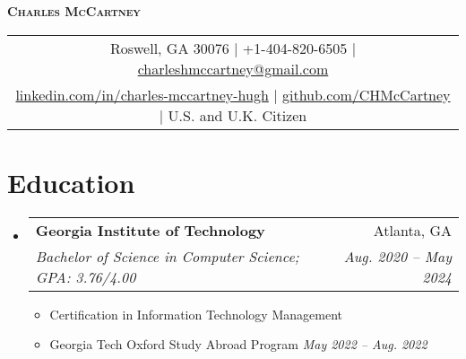\documentclass[letterpaper,11pt]{article}
\makeatletter
\newcommand{\resumeItem}[1]{
  \item\small{
    {#1 \vspace{-2pt}}
  }
}
\newcommand{\resumeSubheading}[4]{
  \vspace{-2pt}\item
    \begin{tabular*}{0.97\textwidth}[t]{l@{\extracolsep{\fill}}r}
      \textbf{#1} & #2 \\
      \textit{\small#3} & \textit{\small #4} \\
    \end{tabular*}\vspace{-7pt}
}
\newcommand{\resumeSubHeadingListStart}{\begin{itemize}[leftmargin=0.15in, label={}]}
\newcommand{\resumeSubHeadingListEnd}{\end{itemize}}
\newcommand{\resumeItemListStart}{\begin{itemize}}
\newcommand{\resumeItemListEnd}{\end{itemize}\vspace{-3pt}}
\makeatother
\begin{document}


\begin{center}
    \textbf{\Large \scshape Charles McCartney} \\ \vspace{1pt}
    \begin{tabular}{c}
    Roswell, GA 30076 $|$ +1-404-820-6505 $|$ \href{mailto:charleshmccartney@gmail.com}{charleshmccartney@gmail.com} \\ 
    \href{https://linkedin.com/in/charles-mccartney-hugh}{linkedin.com/in/charles-mccartney-hugh} 
    $|$
    \href{https://github.com/CHMcCartney}{github.com/CHMcCartney} $|$ U.S. and U.K. Citizen
    \end{tabular}
\end{center}


\section{Education}
  \resumeSubHeadingListStart
    \resumeSubheading
      {Georgia Institute of Technology}{Atlanta, GA}
      {Bachelor of Science in Computer Science; GPA: 3.76/4.00}{Aug. 2020 -- May 2024}
    \resumeItemListStart
        \resumeItem{Certification in Information Technology Management} 
        \resumeItem{Georgia Tech Oxford Study Abroad Program \hfill \emph{May 2022 -- Aug. 2022}}
    \resumeItemListEnd 
  \resumeSubHeadingListEnd
\end{document}
